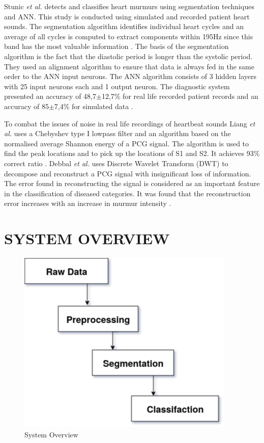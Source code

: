 \documentclass[10pt,twocolumn]{witseiepaper}
\begin{document}
Stunic \textit{et al.} detects and classifies heart murmurs using segmentation techniques and ANN. This study is conducted using simulated and recorded patient heart sounds. The segmentation algorithm identifies individual heart cycles and an average of all cycles is computed to extract components within 195Hz since this band has the most valuable information \cite{strunic}. The basis of the segmentation algorithm is the fact that the diastolic period is longer than the systolic period. They used an alignment algorithm to ensure that data is always fed in the same order to the ANN input neurons. The ANN algorithm consists of 3 hidden layers with 25 input neurons each and 1 output neuron. The diagnostic system presented an accuracy of 48,7$\pm$12,7\% for real life recorded patient records and an accuracy of 85$\pm$7,4\% for simulated data \cite{strunic}.

To combat the issues of noise in real life recordings of heartbeat sounds Liang \textit{et al.} uses a Chebyshev type I lowpass filter and an algorithm  based on the normalised average Shannon energy of a PCG signal. The algorithm is used to find the peak locations and to pick up the locations of S1 and S2. It achieves 93\% correct ratio \cite{liang1997heart}. Debbal \textit{et al.} uses Discrete Wavelet Transform (DWT) to decompose and reconstruct a PCG signal with insignificant loss of information. The error found in reconstructing the signal is considered as an important feature in the classification of diseased categories. It was found that the reconstruction error increases with an increase in murmur intensity \cite{debbal}.



\section{SYSTEM OVERVIEW}

\begin{figure}[h!]
    \centering
    \includegraphics[scale = 0.7]{systemOverviw.png}
    \caption{System Overview}
    \label{fig:sysov}
\end{figure}{}
\end{document}
